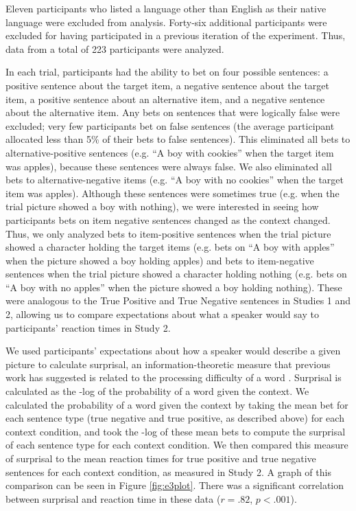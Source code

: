 \documentclass[10pt,letterpaper]{article}
\begin{document}
Eleven participants who listed a language other than English as their native language were excluded from analysis.  Forty-six additional participants were excluded for having participated in a previous iteration of the experiment. Thus, data from a total of 223 participants were analyzed.  

In each trial, participants had the ability to bet on four possible sentences: a positive sentence about the target item, a negative sentence about the target item, a positive sentence about an alternative item, and a negative sentence about the alternative item.  Any bets on sentences that were logically false were excluded; very few participants bet on false sentences (the average participant allocated less than 5\% of their bets to false sentences).  This eliminated all bets to alternative-positive sentences (e.g. ``A boy with cookies'' when the target item was apples), because these sentences were always false.  We also eliminated all bets to alternative-negative items (e.g. ``A boy with no cookies'' when the target item was apples).  Although these sentences were sometimes true (e.g. when the trial picture showed a boy with nothing), we were interested in seeing how participants bets on item negative sentences changed as the context changed.  Thus, we only analyzed bets to item-positive sentences when the trial picture showed a character holding the target items (e.g. bets on ``A boy with apples'' when the picture showed a boy holding apples) and bets to item-negative sentences when the trial picture showed a character holding nothing (e.g. bets on ``A boy with no apples'' when the picture showed a boy holding nothing).  These were analogous to the True Positive and True Negative sentences in Studies 1 and 2, allowing us to compare expectations about what a speaker would say to participants' reaction times in Study 2.  

We used participants' expectations about how a speaker would describe a given picture to calculate surprisal, an information-theoretic measure that previous work has suggested is related to the processing difficulty of a word \cite{levy2008}.  Surprisal is calculated as the -log of the probability of a word given the context.  We calculated the probability of a word given the context by taking the mean bet for each sentence type (true negative and true positive, as described above) for each context condition, and took the -log of these mean bets to compute the surprisal of each sentence type for each context condition.  We then compared this measure of surprisal to the mean reaction times for true positive and true negative sentences for each context condition, as measured in Study 2.  A graph of this comparison can be seen in Figure \ref{fig:e3plot}.  There was a significant correlation between surprisal and reaction time in these data ($r=.82$, $p<.001$).  
\end{document}
